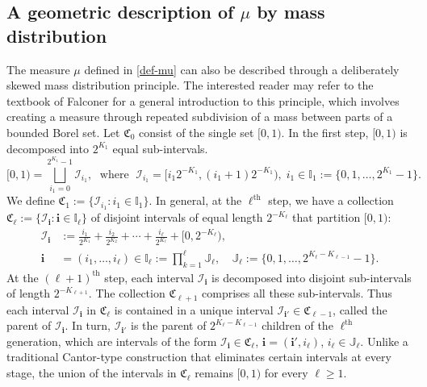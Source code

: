 \documentclass[12pt, twoside]{article}
\theoremstyle{definition}
\numberwithin{equation}{section}
\begin{document}
\subsection{A geometric description of $\mu$ by mass distribution} \label{mu-geometric-section} 
The measure $\mu$ defined in \eqref{def-mu} can also be described through a deliberately skewed mass distribution principle. The interested reader may refer to the textbook of Falconer \cite[Chapter 1, \S 3]{Falconer-book} for a general introduction to
this principle, which involves creating a measure through repeated subdivision of a mass between parts of a bounded Borel set.  
\vskip0.1in 
\noindent Let $\mathfrak C_0$ consist of the single set $[0,1)$. In the first step, $[0,1)$ is decomposed into $2^{K_1}$ equal sub-intervals.  
\[ [0,1)  = \bigsqcup_{i_1 = 0}^{2^{K_1}-1} \mathscr{I}_{i_1}, \; \text{ where } \; \mathscr{I}_{i_1} = \bigl[ i_1 2^{-K_1}, (i_1+1) 2^{-K_1}  \bigr), \; i_1 \in \mathbb I_1 := \{0, 1, \ldots, 2^{K_1}-1\}.    \] 
We define $\mathfrak C_1 := \{\mathscr{I}_{i_1}: i_1 \in \mathbb I_1 \}$. In general, at the $\ell^{\text{th}}$ step, we have a collection $\mathfrak C_{\ell} := \{ \mathscr{I}_{\mathbf i} : \mathbf i \in \mathbb I_{\ell} \}$ of disjoint intervals of equal length $2^{-K_{\ell}}$ that partition $[0,1)$: 
\begin{align*} 
\mathscr{I}_{\mathbf i} &:= \frac{i_1}{2^{K_1}} + \frac{i_2}{2^{K_2}} + \cdots + \frac{i_{\ell}}{2^{K_{\ell}}} + \bigl[0, 2^{-K_{\ell}} \bigr), \\ 
\mathbf i &= (i_1, \ldots, i_{\ell}) \in \mathbb I_{\ell} := \prod_{k=1}^{\ell} \mathbb J_{\ell}, \quad \mathbb J_{\ell} := \bigl\{0, 1, \ldots, 2^{K_{\ell} - K_{\ell-1}}-1\bigr\}. 
\end{align*}  
At the $(\ell+1)^{\text{th}}$ step, each interval $\mathscr{I}_{\mathbf i}$ is decomposed into disjoint sub-intervals of length $2^{-K_{\ell + 1}}$. The collection $\mathfrak C_{\ell+1}$ comprises all these sub-intervals. Thus each interval $\mathscr{I}_{\mathbf i}$ in $\mathfrak C_{\ell}$ is contained in a unique interval $\mathscr{I}_{\mathbf i'} \in \mathfrak C_{\ell-1}$, called the parent of $\mathscr{I}_{\mathbf i}$. In turn, $\mathscr{I}_{\mathbf i'}$ is the parent of $2^{K_{\ell} - K_{\ell-1}}$ children of the $\ell^{\text{th}}$ generation, which are intervals of the form $\mathscr{I}_{\mathbf i} \in \mathfrak C_{\ell}$, $\mathbf i = (\mathbf i', i_{\ell})$, $i_{\ell} \in \mathbb J_{\ell}$.  Unlike a traditional Cantor-type construction that eliminates certain intervals at every stage, the union of the intervals in $\mathfrak C_{\ell}$ remains $[0,1)$ for every $\ell \geq 1$. 
\end{document}
